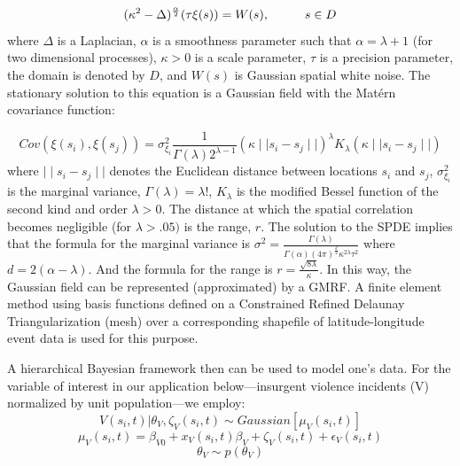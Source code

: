 \documentclass[12pt]{article}
\begin{document}
\begin{equation}
  (\kappa^2 - \Delta)^{\frac{\alpha}{2}}(\tau \xi (s)) = W(s), \hspace*{1cm} s \in D
\end{equation}
\noindent where $\Delta$ is a Laplacian,  $\alpha$ is a smoothness parameter such that
$\alpha = \lambda + 1$ (for two dimensional processes), $\kappa > 0$ is a scale parameter,
$\tau$ is a precision parameter, the domain is denoted by $D$, and $W(s)$ is Gaussian spatial
 white noise. The stationary solution to this equation is a Gaussian field with the
 Mat\'{e}rn covariance function:

\begin{equation}
  Cov(\xi(s_i),\xi(s_j)) = \sigma^2_{\xi_i}\frac{1}{\Gamma(\lambda)2^{\lambda-1}}(\kappa \mid\mid s_i - s_j \mid\mid)^\lambda K_\lambda(\kappa \mid\mid s_i - s_j \mid\mid)
\end{equation}
\noindent where $\mid\mid s_i -s_j\mid\mid$ denotes the Euclidean distance between locations $s_i$ and $s_j$, $\sigma^2_{\xi_i}$ is the marginal variance, $\Gamma(\lambda) = \lambda !$, $K_\lambda$ is the modified Bessel function of the second kind and order $\lambda > 0$. The distance at which the spatial correlation becomes negligible (for $\lambda > .05)$ is the range, $r$. The solution to the SPDE implies that the formula for the marginal variance is $\sigma^2 = \frac{\Gamma(\lambda)}{\Gamma(\alpha)(4\pi)^{\frac{d}{2}}\kappa^{2\lambda}\tau^2}$ where $d=2(\alpha - \lambda)$. And the formula for the range is $r = \frac{\sqrt{8\lambda}}{\kappa}$. In this way, the Gaussian field can be represented (approximated) by a GMRF. A finite element method using basis functions defined on a Constrained Refined Delaunay Triangularization (mesh) over a corresponding shapefile of latitude-longitude event data is used for this purpose.

A hierarchical Bayesian framework then can be used to model one's data. For the variable of interest in our application below---insurgent violence incidents (V)
normalized by unit population---we employ:
\begin{equation}
V(s_i,t)|\theta_V,\zeta_V(s_i,t) \sim Gaussian [\mu_V(s_i,t)]
\end{equation}
\begin{equation}
\mu_V(s_i,t) = \beta_{V0} + x_V(s_i,t)\beta_V + \zeta_V(s_i,t) + \epsilon_V(s_i,t)
\end{equation}
\begin{equation}
  \theta_V \sim p(\theta_V)
\end{equation}
\end{document}
